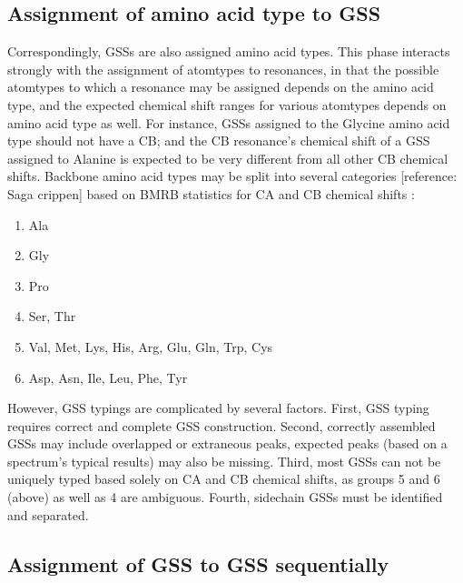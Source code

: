 \subsection{Assignment of amino acid type to GSS}

Correspondingly, GSSs are also assigned amino acid types.  This phase 
interacts strongly with the assignment of atomtypes to resonances, in 
that the possible atomtypes to which a resonance may be assigned depends 
on the amino acid type, and the expected chemical shift ranges for various 
atomtypes depends on amino acid type as well.  For instance, GSSs assigned 
to the Glycine amino acid type should not have a CB; and the CB resonance’s 
chemical shift of a GSS assigned to Alanine is expected to be very different 
from all other CB chemical shifts.  Backbone amino acid types may be split 
into several categories [reference: Saga crippen] based on BMRB statistics for 
CA and CB chemical shifts \cite{bmrb}:
\begin{enumerate}
  \item Ala
  \item Gly 
  \item Pro
  \item Ser, Thr
  \item Val, Met, Lys, His, Arg, Glu, Gln, Trp, Cys
  \item Asp, Asn, Ile, Leu, Phe, Tyr
\end{enumerate}
However, GSS typings are complicated by several factors.  First, GSS typing 
requires correct and complete GSS construction.  Second, correctly assembled 
GSSs may include overlapped or extraneous peaks, expected peaks (based on a 
spectrum’s typical results) may also be missing.  Third, most GSSs can not 
be uniquely typed based solely on CA and CB chemical shifts, as groups 5 and 
6 (above) as well as 4 are ambiguous.  Fourth, sidechain GSSs must be 
identified and separated.

\subsection{Assignment of GSS to GSS sequentially}

